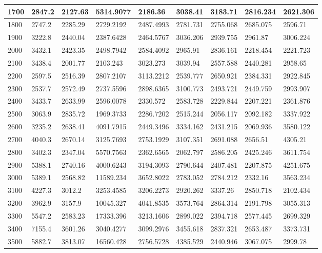 \begin{table}[]
{\begin{tabular}{|l|l|l|l|l|l|l|l|l|}
1700 & 2847.2 & 2127.63 & 5314.9077 & 2186.36 & 3038.41 & 3183.71 & 2816.234 & 2621.306 \\ \hline
1800 & 2747.2 & 2285.29 & 2729.2192 & 2487.4993 & 2781.731 & 2755.068 & 2685.075 & 2596.71 \\ \hline
1900 & 3222.8 & 2440.04 & 2387.6428 & 2464.5767 & 3036.206 & 2939.755 & 2961.87 & 3006.224 \\ \hline
2000 & 3432.1 & 2423.35 & 2498.7942 & 2584.4092 & 2965.91 & 2836.161 & 2218.454 & 2221.723 \\ \hline
2100 & 3438.4 & 2001.77 & 2103.243 & 3023.273 & 3039.94 & 2557.588 & 2440.281 & 2958.65 \\ \hline
2200 & 2597.5 & 2516.39 & 2807.2107 & 3113.2212 & 2539.777 & 2650.921 & 2384.331 & 2922.845 \\ \hline
2300 & 2537.7 & 2572.49 & 2737.5596 & 2898.6365 & 3100.773 & 2493.721 & 2449.759 & 2993.907 \\ \hline
2400 & 3433.7 & 2633.99 & 2596.0078 & 2330.572 & 2583.728 & 2229.844 & 2207.221 & 2361.876 \\ \hline
2500 & 3063.9 & 2835.72 & 1969.3733 & 2286.7202 & 2515.244 & 2056.117 & 2092.182 & 3337.922 \\ \hline
2600 & 3235.2 & 2638.41 & 4091.7915 & 2449.3496 & 3334.162 & 2431.215 & 2069.936 & 3580.122 \\ \hline
2700 & 4040.3 & 2670.14 & 3125.7693 & 2753.1929 & 3107.351 & 2691.088 & 2656.51 & 4305.21 \\ \hline
2800 & 3402.3 & 2347.04 & 5570.7563 & 2362.6565 & 2062.797 & 2586.205 & 2425.246 & 3611.754 \\ \hline
2900 & 5388.1 & 2740.16 & 4000.6243 & 3194.3093 & 2790.644 & 2407.481 & 2207.875 & 4251.675 \\ \hline
3000 & 5389.1 & 2568.82 & 11589.234 & 3652.8022 & 2783.052 & 2784.212 & 2332.16 & 3563.234 \\ \hline
3100 & 4227.3 & 3012.2 & 3253.4585 & 3206.2273 & 2920.262 & 3337.26 & 2850.718 & 2102.434 \\ \hline
3200 & 3962.9 & 3157.9 & 10045.327 & 4041.8535 & 3573.764 & 2864.314 & 2191.798 & 3055.313 \\ \hline
3300 & 5547.2 & 2583.23 & 17333.396 & 3213.1606 & 2899.022 & 2394.718 & 2577.445 & 2699.329 \\ \hline
3400 & 7155.4 & 3601.26 & 3040.4277 & 3099.2976 & 3455.618 & 2837.321 & 2653.487 & 3373.731 \\ \hline
3500 & 5882.7 & 3813.07 & 16560.428 & 2756.5728 & 4385.529 & 2440.946 & 3067.075 & 2999.78 \\ \hline

\end{tabular}}
\end{table}
